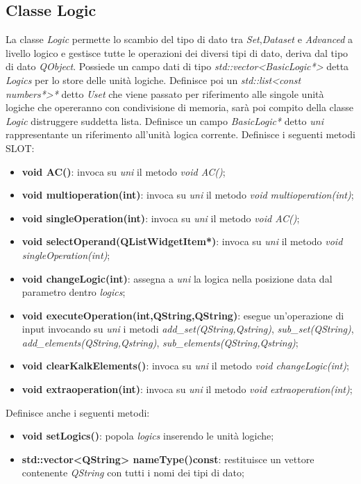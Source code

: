 \documentclass[a4paper,10pt]{article}
\begin{document}
            \subsection{Classe Logic}
            La classe \textit{Logic} permette lo scambio del tipo di dato tra \textit{Set},\textit{Dataset} e \textit{Advanced} a livello logico e gestisce tutte le operazioni dei diversi tipi di dato, deriva dal tipo di dato \textit{QObject}.
            Possiede un campo dati di tipo \textit{std::vector<BasicLogic*>} detta \textit{Logics} per lo store delle unità logiche.
            Definisce poi un \textit{std::list<const numbers*>*} detto \textit{Uset} che viene passato per riferimento alle singole unità logiche che opereranno con condivisione di memoria, sarà poi compito della classe \textit{Logic} distruggere suddetta lista.
            Definisce un campo \textit{BasicLogic*} detto \textit{uni} rappresentante un riferimento all'unità logica corrente.
            Definisce i seguenti metodi SLOT:
            \begin{itemize}
                \item \textbf{void AC()}: invoca su \textit{uni} il metodo \textit{void AC()};
                \item \textbf{void multioperation(int)}: invoca su \textit{uni} il metodo \textit{void multioperation(int)};
                \item \textbf{void singleOperation(int)}: invoca su \textit{uni} il metodo \textit{void AC()};
                \item \textbf{void selectOperand(QListWidgetItem*)}: invoca su \textit{uni} il metodo \textit{void singleOperation(int)};
                \item \textbf{void changeLogic(int)}: assegna a \textit{uni} la logica nella posizione data dal parametro dentro \textit{logics};
                \item \textbf{void executeOperation(int,QString,QString)}: esegue un'operazione di input invocando su \textit{uni} i metodi \textit{add\_set(QString,Qstring)}, \textit{sub\_set(QString)}, \textit{add\_elements(QString,Qstring)}, \textit{sub\_elements(QString,Qstring)};
                \item \textbf{void clearKalkElements()}: invoca su \textit{uni} il metodo \textit{void changeLogic(int)};
                \item \textbf{void extraoperation(int)}: invoca su \textit{uni} il metodo \textit{void extraoperation(int)};
            \end{itemize}
            Definisce anche i seguenti metodi:
            \begin{itemize}
                \item \textbf{void setLogics()}: popola \textit{logics} inserendo le unità logiche;
                \item \textbf{std::vector<QString> nameType()const}: restituisce un vettore contenente \textit{QString} con tutti i nomi dei tipi di dato;
            \end{itemize}
\end{document}
